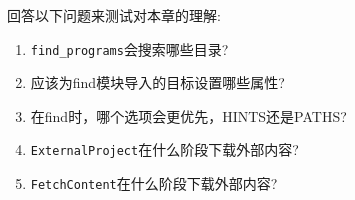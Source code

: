 回答以下问题来测试对本章的理解:

\begin{enumerate}
\item 
\texttt{find\_programs}会搜索哪些目录?

\item 
应该为find模块导入的目标设置哪些属性?

\item 
在find时，哪个选项会更优先，HINTS还是PATHS?

\item 
\texttt{ExternalProject}在什么阶段下载外部内容?

\item 
\texttt{FetchContent}在什么阶段下载外部内容?
\end{enumerate}